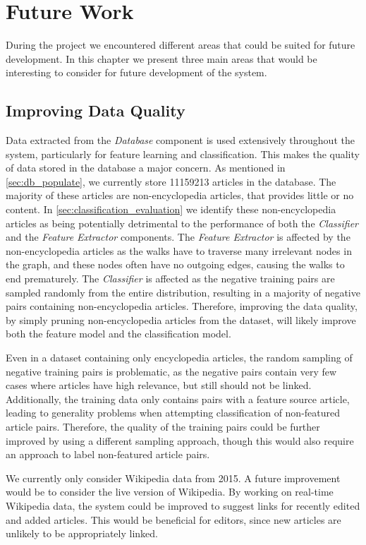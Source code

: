 \chapter{Future Work}\label{sec:future_work}
During the project we encountered different areas that could be suited for future development. In this chapter we present three main areas that would be interesting to consider for future development of the system. 

\section{Improving Data Quality}
Data extracted from the \emph{Database} component is used extensively throughout the system, particularly for feature learning and classification. This makes the quality of data stored in the database a major concern. As mentioned in \cref{sec:db_populate}, we currently store \num{11159213} articles in the database. The majority of these articles are non-encyclopedia articles, that provides little or no content. In \cref{sec:classification_evaluation} we identify these non-encyclopedia articles as being potentially detrimental to the performance of both the \emph{Classifier} and the \emph{Feature Extractor} components. The \emph{Feature Extractor} is affected by the non-encyclopedia articles as the walks have to traverse many irrelevant nodes in the graph, and these nodes often have no outgoing edges, causing the walks to end prematurely. The \emph{Classifier} is affected as the negative training pairs are sampled randomly from the entire distribution, resulting in a majority of negative pairs containing non-encyclopedia articles. Therefore, improving the data quality, by simply pruning non-encyclopedia articles from the dataset, will likely improve both the feature model and the classification model.

Even in a dataset containing only encyclopedia articles, the random sampling of negative training pairs is problematic, as the negative pairs contain very few cases where articles have high relevance, but still should not be linked. Additionally, the training data only contains pairs with a feature source article, leading to generality problems when attempting classification of non-featured article pairs. Therefore, the quality of the training pairs could be further improved by using a different sampling approach, though this would also require an approach to label non-featured article pairs.

We currently only consider Wikipedia data from 2015. A future improvement would be to consider the live version of Wikipedia. By working on real-time Wikipedia data, the system could be improved to suggest links for recently edited and added articles. This would be beneficial for editors, since new articles are unlikely to be appropriately linked.

